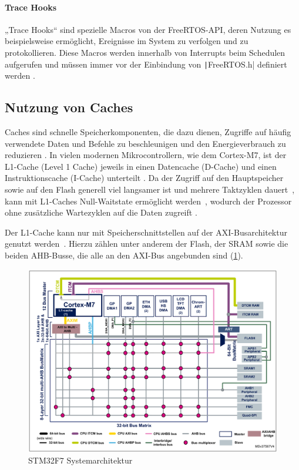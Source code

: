 \paragraph{Trace Hooks}

„Trace Hooks“ sind spezielle Macros von der FreeRTOS-API, deren Nutzung es
beispielsweise ermöglicht, Ereignisse im System zu verfolgen und zu
protokollieren. Diese Macros werden innerhalb von Interrupts beim Schedulen
aufgerufen und müssen immer vor der Einbindung von \texttt|FreeRTOS.h|
definiert werden \cite{freertos_rtos_trace_hooks}.

\subsection{Nutzung von Caches}

Caches sind schnelle Speicherkomponenten, die dazu dienen, Zugriffe auf häufig
verwendete Daten und Befehle zu beschleunigen und den Energieverbrauch zu
reduzieren \cite{ka001150}. In vielen modernen Mikrocontrollern, wie dem
Cortex-M7, ist der L1-Cache (Level 1 Cache) jeweils in einen Datencache
(D-Cache) und einen Instruktionscache (I-Cache) unterteilt \cite[S. 6]{an4667}.
Da der Zugriff auf den Hauptspeicher sowie auf den Flash generell viel langsamer
ist und mehrere Taktzyklen dauert~\cite{stm32_memory_sections}, kann mit
L1-Caches Null-Waitstate ermöglicht werden~\cite[S. 6]{an4667}, wodurch der
Prozessor ohne zusätzliche Wartezyklen auf die Daten zugreift
\cite{waitstate_wiki}.

Der L1-Cache kann nur mit Speicherschnittstellen auf der \ac{AXI}-Busarchitektur
genutzt werden~\cite[S. 4]{an4839}. Hierzu zählen unter anderem der Flash, der
\ac{SRAM} sowie die beiden \ac{AHB}-Busse, die alle an den AXI-Bus angebunden
sind (\ref{fig:m7_sys_arch}).

\begin{figure}[htb]
    \centering
    \includegraphics[width=1\textwidth]{assets/m7_system_arch}
    \caption{STM32F7 Systemarchitektur \cite[S. 9]{an4667}}
    \label{fig:m7_sys_arch}
\end{figure}

